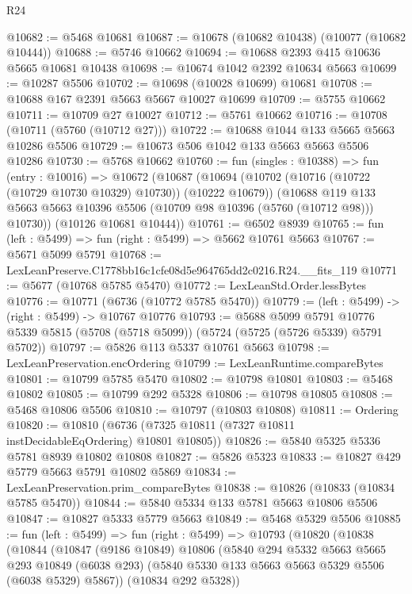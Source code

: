 \begin{lexlean}{R24}
\begin{coremodule}
@10682 := @5468 @10681
@10687 := @10678 (@10682 @10438) (@10077 (@10682 @10444))
@10688 := @5746 @10662
@10694 := @10688 @2393 @415 @10636 @5665 @10681 @10438
@10698 := @10674 @1042 @2392 @10634 @5663
@10699 := @10287 @5506
@10702 := @10698 (@10028 @10699) @10681
@10708 := @10688 @167 @2391 @5663 @5667 @10027 @10699
@10709 := @5755 @10662
@10711 := @10709 @27 @10027
@10712 := @5761 @10662
@10716 := @10708 (@10711 (@5760 (@10712 @27)))
@10722 := @10688 @1044 @133 @5665 @5663 @10286 @5506
@10729 := @10673 @506 @1042 @133 @5663 @5663 @5506 @10286
@10730 := @5768 @10662
@10760 := fun (singles : @10388) =>
  fun (entry : @10016) =>
  @10672
    (@10687
      (@10694
        (@10702 (@10716 (@10722 (@10729 @10730 @10329) @10730)) (@10222 @10679))
        (@10688 @119 @133 @5663 @5663 @10396 @5506 (@10709 @98 @10396 (@5760 (@10712 @98))) @10730))
      (@10126 @10681 @10444))
@10761 := @6502 @8939
@10765 := fun (left : @5499) => fun (right : @5499) => @5662 @10761 @5663
@10767 := @5671 @5099 @5791
@10768 := LexLeanPreserve.C1778bb16c1cfe08d5e964765dd2c0216.R24.__fits_119
@10771 := @5677 (@10768 @5785 @5470)
@10772 := LexLeanStd.Order.lessBytes
@10776 := @10771 (@6736 (@10772 @5785 @5470))
@10779 := (left : @5499) -> (right : @5499) -> @10767 @10776
@10793 := @5688
    @5099
    @5791
    @10776
    @5339
    @5815
    (@5708 (@5718 @5099))
    (@5724 (@5725 (@5726 @5339) @5791 @5702))
@10797 := @5826 @113 @5337 @10761 @5663
@10798 := LexLeanPreservation.encOrdering
@10799 := LexLeanRuntime.compareBytes
@10801 := @10799 @5785 @5470
@10802 := @10798 @10801
@10803 := @5468 @10802
@10805 := @10799 @292 @5328
@10806 := @10798 @10805
@10808 := @5468 @10806 @5506
@10810 := @10797 (@10803 @10808)
@10811 := Ordering
@10820 := @10810 (@6736 (@7325 @10811 (@7327 @10811 instDecidableEqOrdering) @10801 @10805))
@10826 := @5840 @5325 @5336 @5781 @8939 @10802 @10808
@10827 := @5826 @5323
@10833 := @10827 @429 @5779 @5663 @5791 @10802 @5869
@10834 := LexLeanPreservation.prim_compareBytes
@10838 := @10826 (@10833 (@10834 @5785 @5470))
@10844 := @5840 @5334 @133 @5781 @5663 @10806 @5506
@10847 := @10827 @5333 @5779 @5663
@10849 := @5468 @5329 @5506
@10885 := fun (left : @5499) =>
  fun (right : @5499) =>
  @10793
    (@10820
      (@10838
        (@10844
          (@10847
            (@9186 @10849)
            @10806
            (@5840
              @294
              @5332
              @5663
              @5665
              @293
              @10849
              (@6038 @293)
              (@5840 @5330 @133 @5663 @5663 @5329 @5506 (@6038 @5329) @5867))
            (@10834 @292 @5328))

\end{coremodule}
\end{lexlean}
